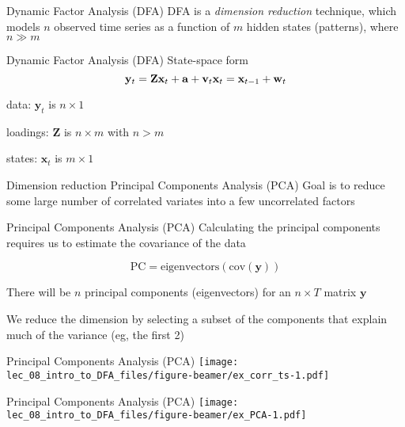 \documentclass[
  ignorenonframetext,
]{beamer}
\begin{document}
\begin{frame}{Dynamic Factor Analysis (DFA)}
\protect\hypertarget{dynamic-factor-analysis-dfa}{}
DFA is a \emph{dimension reduction} technique, which models \(n\)
observed time series as a function of \(m\) hidden states (patterns),
where \(n \gg m\)
\end{frame}

\begin{frame}{Dynamic Factor Analysis (DFA) \textbar{} State-space form}
\protect\hypertarget{dynamic-factor-analysis-dfa-state-space-form}{}
\[
\mathbf{y}_t = \mathbf{Z} \mathbf{x}_t + \mathbf{a} + \mathbf{v}_t \\
\mathbf{x}_t = \mathbf{x}_{t-1} + \mathbf{w}_t
\]

data: \(\mathbf{y}_t\) is \(n \times 1\)

loadings: \(\mathbf{Z}\) is \(n \times m\) with \(n > m\)

states: \(\mathbf{x}_t\) is \(m \times 1\)
\end{frame}

\begin{frame}{Dimension reduction \textbar{} Principal Components
Analysis (PCA)}
\protect\hypertarget{dimension-reduction-principal-components-analysis-pca}{}
Goal is to reduce some large number of correlated variates into a few
uncorrelated factors
\end{frame}

\begin{frame}{Principal Components Analysis (PCA)}
\protect\hypertarget{principal-components-analysis-pca}{}
Calculating the principal components requires us to estimate the
covariance of the data

\[
\text{PC} = \text{eigenvectors}(\text{cov}(\mathbf{y}))
\]

There will be \(n\) principal components (eigenvectors) for an
\(n \times T\) matrix \(\mathbf{y}\)

We reduce the dimension by selecting a subset of the components that
explain much of the variance (eg, the first 2)
\end{frame}

\begin{frame}{Principal Components Analysis (PCA)}
\protect\hypertarget{principal-components-analysis-pca-1}{}
\texttt{[image: lec\_08\_intro\_to\_DFA\_files/figure-beamer/ex\_corr\_ts-1.pdf]}
\end{frame}

\begin{frame}{Principal Components Analysis (PCA)}
\protect\hypertarget{principal-components-analysis-pca-2}{}
\texttt{[image: lec\_08\_intro\_to\_DFA\_files/figure-beamer/ex\_PCA-1.pdf]}
\end{frame}
\end{document}
